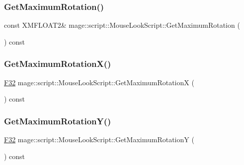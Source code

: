 \subsubsection{\texorpdfstring{Get\+Maximum\+Rotation()}{GetMaximumRotation()}}
{\footnotesize\ttfamily const X\+M\+F\+L\+O\+A\+T2\& mage\+::script\+::\+Mouse\+Look\+Script\+::\+Get\+Maximum\+Rotation (\begin{DoxyParamCaption}{ }\end{DoxyParamCaption}) const\hspace{0.3cm}{\ttfamily [noexcept]}}

\hypertarget{classmage_1_1script_1_1_mouse_look_script_a5d0e63ee050bf07f5c8ad75ca9ced307}{}\label{classmage_1_1script_1_1_mouse_look_script_a5d0e63ee050bf07f5c8ad75ca9ced307} 
\subsubsection{\texorpdfstring{Get\+Maximum\+Rotation\+X()}{GetMaximumRotationX()}}
{\footnotesize\ttfamily \hyperlink{namespacemage_aa97e833b45f06d60a0a9c4fc22ae02c0}{F32} mage\+::script\+::\+Mouse\+Look\+Script\+::\+Get\+Maximum\+RotationX (\begin{DoxyParamCaption}{ }\end{DoxyParamCaption}) const\hspace{0.3cm}{\ttfamily [noexcept]}}

\hypertarget{classmage_1_1script_1_1_mouse_look_script_a24f48ac9e66f9c14645db71fd55ab9c6}{}\label{classmage_1_1script_1_1_mouse_look_script_a24f48ac9e66f9c14645db71fd55ab9c6} 
\subsubsection{\texorpdfstring{Get\+Maximum\+Rotation\+Y()}{GetMaximumRotationY()}}
{\footnotesize\ttfamily \hyperlink{namespacemage_aa97e833b45f06d60a0a9c4fc22ae02c0}{F32} mage\+::script\+::\+Mouse\+Look\+Script\+::\+Get\+Maximum\+RotationY (\begin{DoxyParamCaption}{ }\end{DoxyParamCaption}) const\hspace{0.3cm}{\ttfamily [noexcept]}}

